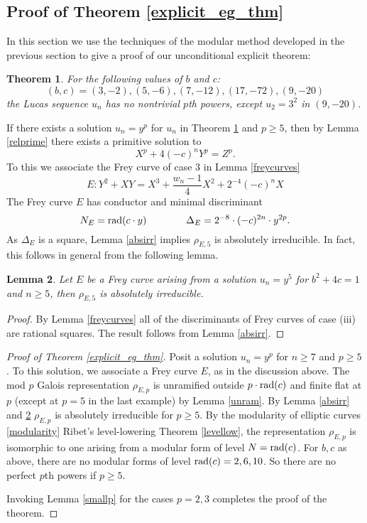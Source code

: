 \documentclass[12pt]{amsart}
\newtheorem{thm}{Theorem}[section]
\newtheorem{lem}[thm]{Lemma}
\theoremstyle{definition}
\newcommand{\rad}{{\rm{rad}}}
\begin{document}
\subsection{Proof of Theorem \ref{explicit_eg_thm}}

In this section we use the techniques of the modular method developed in the previous section to give a proof of our unconditional explicit theorem:

\begin{thm}\label{explicit_eg_thm_inplace}
For the following values of $b$ and $c$:
\begin{equation}\label{examples} (b,c) = (3,-2), (5,-6), (7,-12), (17,-72), (9,-20) \end{equation}
the Lucas sequence $u_n$ has no nontrivial $p$th powers, except $u_2 = 3^2$ in $(9,-20)$.
\end{thm}


If there exists a solution $u_n = y^p$ for $u_n$ in Theorem \ref{explicit_eg_thm_inplace} and $p \geq 5$, then by Lemma \ref{relprime} there exists a primitive solution to 
\[ X^p + 4(-c)^n Y^p = Z^p. \]
To this we associate the Frey curve of case 3 in Lemma \ref{freycurves}
\[E: Y^2 + XY = X^3 + \frac{w_n - 1}{4} X^2 + 2^{-4}(-c)^nX \]
The Frey curve $E$ has conductor and minimal discriminant
\[ N_E =\rad(c \cdot y)  \qquad \qquad \Delta_E = 2^{-8} \cdot (-c)^{2n} \cdot y^{2p}. \]
As $\Delta_E$ is a square, Lemma \ref{absirr} implies $\rho_{E,5}$ is absolutely irreducible.  In fact, this follows in general from the following lemma.

\begin{lem}\label{frey5irr}
Let $E$ be a Frey curve arising from a solution $u_n = y^5$ for $b^2+4c = 1$ and $n\geq 5$, then $\rho_{E,5}$ is absolutely irreducible.
\end{lem}
\begin{proof}
By Lemma \ref{freycurves} all of the discriminants of Frey curves of case (iii) are rational squares.  The result follows from Lemma \ref{absirr}.
\end{proof}

\begin{proof}[Proof of Theorem \ref{explicit_eg_thm}]
Posit a solution $u_n = y^p$ for $n \geq 7$ and $p \geq 5$.  To this solution, we associate a Frey curve $E$, as in the discussion above.  The mod $p$ Galois representation $\rho_{E,p}$ is unramified outside $p\cdot \rad{(c)}$ and finite flat at $p$ (except at $p=5$ in the last example) by Lemma \ref{unram}.   By Lemma \ref{absirr} and \ref{frey5irr} $\rho_{E,p}$ is absolutely irreducible for $p\geq 5$.  By the modularity of elliptic curves \ref{modularity} Ribet's level-lowering Theorem \ref{levellow}, the representation $\rho_{E,p}$ is isomorphic to one arising from a modular form of level $N = \rad(c)$.  For $b,c$ as above, there are no modular forms of level $\rad(c)=2,6,10$.  So there are no perfect $p$th powers if $p \geq 5$.

Invoking Lemma \ref{smallp} for the cases $p=2,3$ completes the proof of the theorem.
\end{proof}
\end{document}
